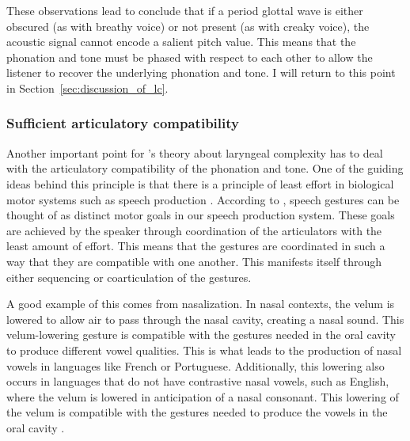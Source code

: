 These observations lead \citet{silvermanLaryngealComplexityOtomanguean1997} to conclude that if a period glottal wave is either obscured (as with breathy voice) or not present (as with creaky voice), the acoustic signal cannot encode a salient pitch value. This means that the phonation and tone must be phased with respect to each other to allow the listener to recover the underlying phonation and tone. I will return to this point in Section~\ref{sec:discussion_of_lc}.

\subsubsection{Sufficient articulatory compatibility}\label{sec:sufficient_articulatory_compatibility}

Another important point for \citeauthor{silvermanLaryngealComplexityOtomanguean1997}'s theory about laryngeal complexity has to deal with the articulatory compatibility of the phonation and tone. One of the guiding ideas behind this principle is that there is a principle of least effort in biological motor systems such as speech production \citep{lindblomEconomySpeechGestures1983}. According to \citet{lindblomEconomySpeechGestures1983}, speech gestures can be thought of as distinct motor goals in our speech production system. These goals are achieved by the speaker through coordination of the articulators with the least amount of effort. This means that the gestures are coordinated in such a way that they are compatible with one another. This manifests itself through either sequencing or coarticulation of the gestures.

A good example of this comes from nasalization. In nasal contexts, the velum is lowered to allow air to pass through the nasal cavity, creating a nasal sound. This velum-lowering gesture is compatible with the gestures needed in the oral cavity to produce different vowel qualities. This is what leads to the production of nasal vowels in languages like French or Portuguese. Additionally, this lowering also occurs in languages that do not have contrastive nasal vowels, such as English, where the velum is lowered in anticipation of a nasal consonant. This lowering of the velum is compatible with the gestures needed to produce the vowels in the oral cavity \citep[e.g.,][]{ohalaPhoneticExplanationsNasal1975,chenAcousticCorrelatesEnglish1997,stylerAcousticalPerceptualFeatures2015}.

